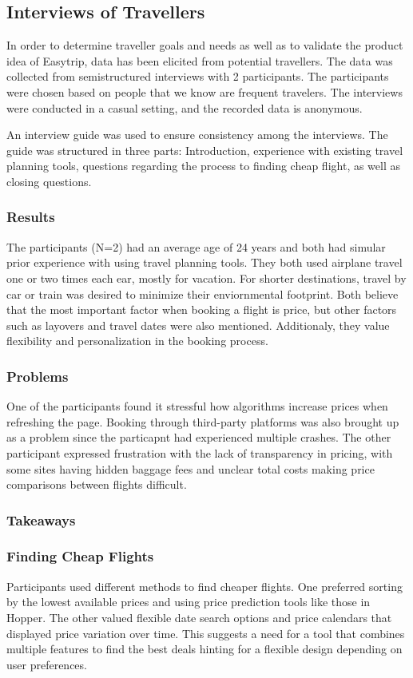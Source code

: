 \subsection{Interviews of Travellers}
In order to determine traveller goals and needs as well as to validate the product idea of Easytrip, data has been elicited from potential travellers. The data was collected from semistructured interviews with 2 participants. The participants were chosen based on people that we know are frequent travelers. The interviews were conducted in a casual setting, and the recorded data is anonymous.

An interview guide was used to ensure consistency among the interviews. The guide was structured in three parts: Introduction, experience with existing travel planning tools, questions regarding the process to finding cheap flight, as well as closing questions. 

\subsubsection{Results}
The participants (N=2) had an average age of 24 years and both had simular prior experience with using travel planning tools. They both used airplane travel one or two times each ear, mostly for vacation. For shorter destinations, travel by car or train was desired to minimize their enviornmental footprint. Both believe that the most important factor when booking a flight is price, but other factors such as layovers and travel dates were also mentioned. Additionaly, they value flexibility and personalization in the booking process. 

\subsubsection{Problems}
One of the participants found it stressful how algorithms increase prices when refreshing the page. Booking through third-party platforms was also brought up as a problem since the particapnt had experienced multiple crashes. The other participant expressed frustration with the lack of transparency in pricing, with some sites having hidden baggage fees and unclear total costs making price comparisons between flights difficult. 

\subsubsection{Takeaways}


\subsubsection{Finding Cheap Flights}
Participants used different methods to find cheaper flights. One preferred sorting by the lowest available prices and using price prediction tools like those in Hopper. The other valued flexible date search options and price calendars that displayed price variation over time. This suggests a need for a tool that combines multiple features to find the best deals hinting for a flexible design depending on user preferences.


